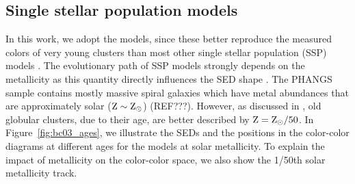 




\subsection{Single stellar population models}\label{ssect:ssp_models}
In this work, we adopt the  models, since these better reproduce the measured colors of very young clusters than most other single stellar population (SSP) models \citep[e.g.][]{turner_phangs-hst_2021}.
The evolutionary path of SSP models strongly depends on the metallicity as this quantity directly influences the SED shape \citep{buser_library_1992,lejeune_standard_1997}.
The PHANGS sample contains mostly massive spiral galaxies which have metal abundances that are approximately solar (${\rm Z \sim Z_{\odot}}$) (REF???). However, as discussed in \citet{whitmore_improving_2023}, old globular clusters, due to their age, are better described by ${\rm Z = Z_{\odot}/50}$. In Figure~\ref{fig:bc03_ages}, we illustrate the SEDs and the positions in the color-color diagrams at different ages for the  models at solar metallicity. To explain the impact of metallicity on the color-color space, we also show the 1/50th solar metallicity track. 

